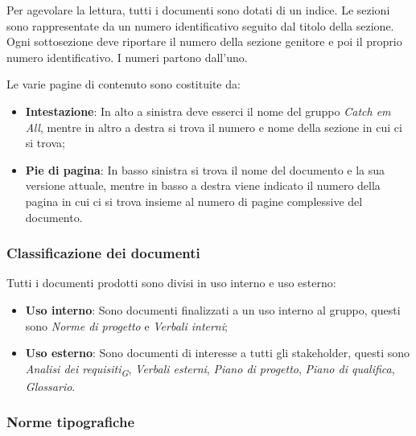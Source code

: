 Per agevolare la lettura, tutti i documenti sono dotati di un indice. Le sezioni sono rappresentate da un numero identificativo seguito dal titolo della sezione. Ogni sottosezione deve riportare il numero della sezione genitore e poi il proprio numero identificativo. I numeri partono dall'uno.

Le varie pagine di contenuto sono costituite da:
\begin{itemize}
    \item \textbf{Intestazione}: In alto a sinistra deve esserci il nome del gruppo \textit{Catch em All}, mentre in altro a destra si trova il numero e nome della sezione in cui ci si trova;
    \item \textbf{Pie di pagina}: In basso sinistra si trova il nome del documento e la sua versione attuale, mentre in basso a destra viene indicato il numero della pagina in cui ci si trova insieme al numero di pagine complessive del documento.
\end{itemize}

\subsubsection{Classificazione dei documenti}
Tutti i documenti prodotti sono divisi in uso interno e uso esterno:
\begin{itemize}
    \item \textbf{Uso interno}: Sono documenti finalizzati a un uso interno al gruppo, questi sono \textit{Norme di progetto} e \textit{Verbali interni};
    \item \textbf{Uso esterno}: Sono documenti di interesse a tutti gli stakeholder, questi sono \textit{Analisi dei requisiti\textsubscript{G}}, \textit{Verbali esterni}, \textit{Piano di progetto}, \textit{Piano di qualifica}, \textit{Glossario}.
\end{itemize}

\subsubsection{Norme tipografiche}


